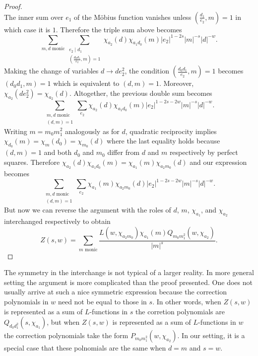 \documentclass[12pt,reqno,oneside]{amsart}
\begin{document}
\begin{proof}
\[        \]
        The inner sum over $e_{1}$ of the M\"obius function vanishes unless $\left(\frac{d_{1}}{e_{2}},m\right) = 1$ in which case it is $1$. Therefore the triple sum above becomes
        \[
            \sum_{\text{$m,d$ monic}}\sum_{\substack{e_{2} \mid d_{1} \\ \left(\frac{d_{0}d_{1}}{e_{2}},m\right) = 1}}\chi_{a_{2}}(d)\chi_{a_{1}d_{0}}(m)|e_{2}|^{1-2s}|m|^{-s}|d|^{-w}.
        \]
        Making the change of variables $d \to de_{2}^{2}$, the condition $\left(\frac{d_{0}d_{1}}{e_{2}},m\right) = 1$ becomes $(d_{0}d_{1},m) = 1$ which is equivalent to $(d,m) = 1$. Moreover, $\chi_{a_{2}}(de_{2}^{2}) = \chi_{a_{2}}(d)$. Altogether, the previous double sum becomes
        \[
            \sum_{\substack{\text{$m,d$ monic} \\ (d,m) = 1}}\sum_{e_{2}}\chi_{a_{2}}(d)\chi_{a_{1}d_{0}}(m)|e_{2}|^{1-2s-2w}|m|^{-s}|d|^{-w}.
        \]
        Writing $m = m_{0}m_{1}^{2}$ analogously as for $d$, quadratic reciprocity implies $\chi_{d_{0}}(m) = \chi_{m}(d_{0}) = \chi_{m_{0}}(d)$ where the last equality holds because $(d,m) = 1$ and both $d_{0}$ and $m_{0}$ differ from $d$ and $m$ respectively by perfect squares. Therefore $\chi_{a_{2}}(d)\chi_{a_{1}d_{0}}(m) = \chi_{a_{1}}(m)\chi_{a_{2}m_{0}}(d)$ and our expression becomes
        \[
            \sum_{\substack{\text{$m,d$ monic} \\ (d,m) = 1}}\sum_{e_{2}}\chi_{a_{1}}(m)\chi_{a_{2}m_{0}}(d)|e_{2}|^{1-2s-2w}|m|^{-s}|d|^{-w}.
        \]
        But now we can reverse the argument with the roles of $d$, $m$, $\chi_{a_{1}}$, and $\chi_{a_{2}}$ interchanged respectively to obtain
        \[
            Z(s,w) = \sum_{\text{$m$ monic}}\frac{L(w,\chi_{a_{2}m_{0}})\chi_{a_{1}}(m)Q_{m_{0}m_{1}^{2}}(w,\chi_{a_{2}})}{|m|^{s}}.
        \]
    \end{proof}

    The symmetry in the interchange is not typical of a larger reality. In more general setting the argument is more complicated than the proof presented. One does not usually arrive at such a nice symmetric expression because the correction polynomials in $w$ need not be equal to those in $s$. In other words, when $Z(s,w)$ is represented as a sum of $L$-functions in $s$ the corretion polynomials are $Q_{d_{0}d_{1}^{2}}(s,\chi_{a_{1}})$, but when $Z(s,w)$ is represented as a sum of $L$-functions in $w$ the correction polynomials take the form $P_{m_{0}m_{1}^{2}}(w,\chi_{a_{2}})$. In our setting, it is a special case that these polnomials are the same when $d = m$ and $s = w$.
\end{document}
